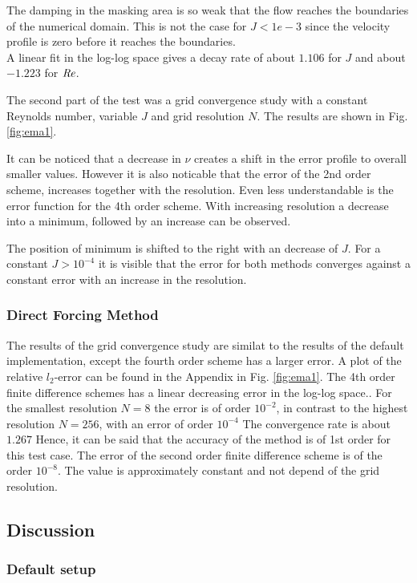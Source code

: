 The damping in the masking area is so weak that the flow reaches the  boundaries of the numerical domain.
This is not the case for $J<1e-3$ since the velocity profile is zero before it reaches the boundaries.\\
A linear fit in the log-log space gives a  decay rate of about $1.106$ for  $J$ and about $-1.223$ for $\mbox{\textit{Re}}$.

The second part of the test was a grid convergence study with a constant Reynolds number, variable $J$ and grid resolution $N$.
The results are shown in Fig. \ref{fig:ema1}.

It can be noticed that a decrease in $\nu$ creates a shift in the error profile to overall smaller values.
However it is also noticable that the error of the 2nd order scheme, increases together with the resolution.
Even less understandable is the error function for the 4th order scheme.
With increasing resolution  a decrease into a minimum, followed by an increase can be observed.

The position of minimum is shifted to the right with an decrease of $J$.
For a constant $J>10^{-4}$ it is visible that the error for both methods converges against a
constant error  with an increase in the resolution.

\subsubsection{Direct Forcing Method}

The results of the grid convergence study are similat to the results of the default implementation,
except the fourth order scheme has a larger error.
A plot of the relative $l_2$-error can be found in the Appendix  in Fig. \ref{fig:ema1}.
The 4th order finite difference schemes has a linear decreasing error in the log-log space..
For the smallest resolution $N=8$ the error is of order $10^{-2}$,
in contrast to the highest resolution $N=256$, with an error of order $10^{-4}$
The convergence rate is about $1.267$
Hence, it can be said that the accuracy of the method is of 1st order for this test case.
The error of the second order finite difference scheme is of the order $10^{-8}$.
The value is approximately constant and not depend of the grid resolution.

\clearpage

\subsection{Discussion}
\subsubsection{Default setup}


